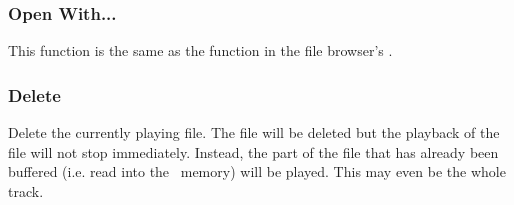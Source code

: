 \subsubsection{Open With...}
This  function is the same as the  
function in the file browser's .

\subsubsection{Delete}
Delete the currently playing file. The file will be deleted but the playback
of the file will not stop immediately. Instead, the part of the file that
has already been buffered (i.e. read into the \daps\ memory) will be played.
This may even be the whole track. 

